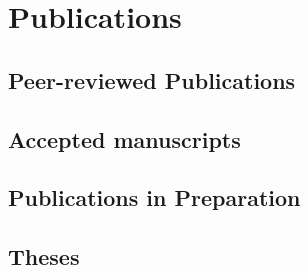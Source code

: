 \ifacademic
  \section{Publications}
  
  \subsection{Peer-reviewed Publications}
    \begin{refsection}
      \vspace{2mm}
      \onehalfspacing
      \nocite{
        Worman2020,
        DiBaldassarre2018,
        Breinl2017,
        GironsLopez2017,
        GironsLopez2016a,
        Mbanguka2016,
        GironsLopez2015
      }
      \printbibliography[heading=none]
    \end{refsection}

  \subsection{Accepted manuscripts}
    \begin{refsection}
      \vspace{2mm}
      \onehalfspacing
      \nocite{
        GironsLopez2020,
      }
      \printbibliography[heading=none]
    \end{refsection}
    
  \subsection{Publications in Preparation}
    \begin{refsection}
      \vspace{2mm}
      \onehalfspacing
      \nocite{
        GironsLopez2020a,
      }
      \printbibliography[heading=none]
    \end{refsection}
  
  \subsection{Theses}
    \begin{refsection}
      \vspace{2mm}
      \onehalfspacing
      \nocite{
        GironsLopez2016,
        GironsLopez2011
      }
      \printbibliography[heading=none]
    \end{refsection}
  
  \newpage

